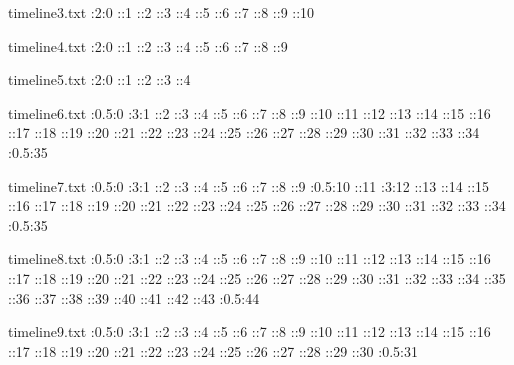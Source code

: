 \begin{filecontents}[overwrite]{timeline3.txt}
:2:0
::1
::2
::3
::4
::5
::6
::7
::8
::9
::10
\end{filecontents}

\begin{filecontents}[overwrite]{timeline4.txt}
:2:0
::1
::2
::3
::4
::5
::6
::7
::8
::9
\end{filecontents}

\begin{filecontents}[overwrite]{timeline5.txt}
:2:0
::1
::2
::3
::4
\end{filecontents}

\begin{filecontents}[overwrite]{timeline6.txt}
:0.5:0
:3:1
::2
::3
::4
::5
::6
::7
::8
::9
::10
::11
::12
::13
::14
::15
::16
::17
::18
::19
::20
::21
::22
::23
::24
::25
::26
::27
::28
::29
::30
::31
::32
::33
::34
:0.5:35
\end{filecontents}

\begin{filecontents}[overwrite]{timeline7.txt}
:0.5:0
:3:1
::2
::3
::4
::5
::6
::7
::8
::9
:0.5:10
::11
:3:12
::13
::14
::15
::16
::17
::18
::19
::20
::21
::22
::23
::24
::25
::26
::27
::28
::29
::30
::31
::32
::33
::34
:0.5:35
\end{filecontents}

\begin{filecontents}[overwrite]{timeline8.txt}
:0.5:0
:3:1
::2
::3
::4
::5
::6
::7
::8
::9
::10
::11
::12
::13
::14
::15
::16
::17
::18
::19
::20
::21
::22
::23
::24
::25
::26
::27
::28
::29
::30
::31
::32
::33
::34
::35
::36
::37
::38
::39
::40
::41
::42
::43
:0.5:44
\end{filecontents}

\begin{filecontents}[overwrite]{timeline9.txt}
:0.5:0
:3:1
::2
::3
::4
::5
::6
::7
::8
::9
::10
::11
::12
::13
::14
::15
::16
::17
::18
::19
::20
::21
::22
::23
::24
::25
::26
::27
::28
::29
::30
:0.5:31
\end{filecontents}



